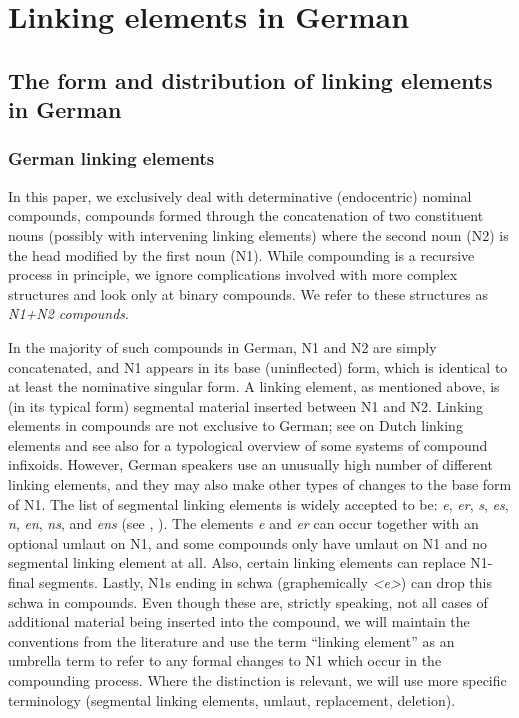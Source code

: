 \section{Linking elements in German}
\label{sec:linkingelementsingerman}

\subsection{The form and distribution of linking elements in German}
\label{sec:theformanddistributionoflinkingelementsingerman}

\subsubsection{German linking elements}

In this paper, we exclusively deal with determinative (endocentric) nominal compounds, \ie compounds formed through the concatenation of two constituent nouns (possibly with intervening linking elements) where the second noun (N2) is the head modified by the first noun (N1).
While compounding is a recursive process in principle, we ignore complications involved with more complex structures and look only at binary compounds.
We refer to these structures as \textit{N1+N2 compounds}.

In the majority of such compounds in German, N1 and N2 are simply concatenated, and N1 appears in its base (uninflected) form, which is identical to at least the nominative singular form.
A linking element, as mentioned above, is (in its typical form) segmental material inserted between N1 and N2.
Linking elements in compounds are not exclusive to German; see \textcite{SchreuderEa1998,BangaEa2013a,BangaEa2013b} on Dutch linking elements and see also \textcite[27]{KrottEa2007} for a typological overview of some systems of compound infixoids.
However, German speakers use an unusually high number of different linking elements, and they may also make other types of changes to the base form of N1.
The list of segmental linking elements is widely accepted to be: \textit{e}, \textit{er}, \textit{s}, \textit{es}, \textit{n}, \textit{en}, \textit{ns}, and \textit{ens} (see \citealt[31]{Neef2015}, \citealt{KrottEa2007}).
The elements \textit{e} and \textit{er} can occur together with an optional umlaut on N1, and some compounds only have umlaut on N1 and no segmental linking element at all.
Also, certain linking elements can replace N1-final segments.
Lastly, N1s ending in schwa (graphemically \textit{<e>}) can drop this schwa in compounds.
Even though these are, strictly speaking, not all cases of additional material being inserted into the compound, we will maintain the conventions from the literature and use the term ``linking element'' as an umbrella term to refer to any formal changes to N1 which occur in the compounding process.
Where the distinction is relevant, we will use more specific terminology (\ie segmental linking elements, umlaut, replacement, deletion).

